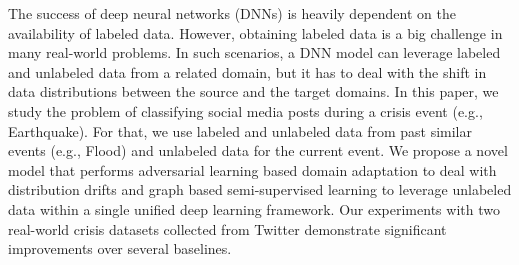 The success of deep neural networks (DNNs) is heavily dependent on the availability of labeled data. However, obtaining labeled data is a big challenge in many real-world problems. In such scenarios, a DNN model can leverage labeled and unlabeled data from a related domain, but it has to deal with the shift in data distributions between the source and the target domains. In this paper, we study the problem of classifying social media posts during a crisis event (e.g., Earthquake). For that, we use labeled and unlabeled data from past similar events (e.g., Flood) and unlabeled data for the current event. We propose a novel model that performs adversarial learning based domain adaptation to deal with distribution drifts and graph based semi-supervised learning to leverage unlabeled data within a single unified deep learning framework. Our experiments with two real-world crisis datasets collected from Twitter demonstrate significant improvements over several baselines.
